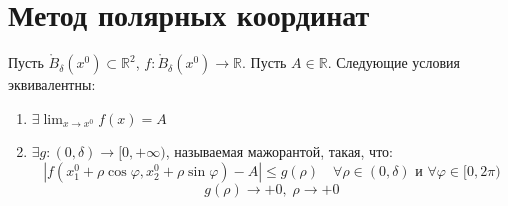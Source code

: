 \documentclass[11pt]{article}
\begin{document}
\section{Метод полярных координат}

\begin{lemma}
    Пусть $\mathring{B}_{\delta}\left(x^0\right) \subset \mathbb{R}^2$, $f \colon \mathring{B}_{\delta}\left(x^0\right) \to \mathbb{R}$. Пусть $A \in \mathbb{R}$.
    Следующие условия эквивалентны:
    \begin{enumerate}
        \item $\displaystyle \exists \lim_{x \to x^0} f(x) = A$
        \item $\exists g \colon (0, \delta) \to [0, +\infty)$, называемая мажорантой, такая, что:
        \[\left\lvert f\left(x_1^0 + \rho \cos \varphi, x_2^0 + \rho \sin \varphi \right) - A\right\rvert \leq g(\rho) \quad \forall \rho \in (0, \delta) \text{ и } \forall \varphi \in [0, 2 \pi)\]
        \[g(\rho) \to +0, \; \rho \to +0\]
    \end{enumerate}
\end{lemma}
\end{document}
